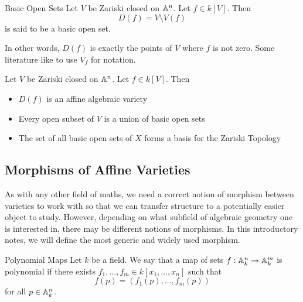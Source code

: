 \documentclass[a4paper]{article}
\begin{document}
\begin{defn}{Basic Open Sets}{} Let $V$ be Zariski closed on $\mathbb{A}^n$. Let $f\in k[V]$. Then $$D(f)=V\setminus V(f)$$ is said to be a basic open set. 
\end{defn}

In other words, $D(f)$ is exactly the points of $V$ where $f$ is not zero. Some literature like to use $V_f$ for notation. 

\begin{prp}{}{} Let $V$ be Zariski closed on $\mathbb{A}^n$. Let $f\in k[V]$. Then 
\begin{itemize}
\item $D(f)$ is an affine algebraic variety
\item Every open subset of $V$ is a union of basic open sets
\item The set of all basic open sets of $X$ forms a basis for the Zariski Topology
\end{itemize}
\end{prp}

\subsection{Morphisms of Affine Varieties}
As with any other field of maths, we need a correct notion of morphism between varieties to work with so that we can transfer structure to a potentially easier object to study. However, depending on what subfield of algebraic geometry one is interested in, there may be different notions of morphisms. In this introductory notes, we will define the most generic and widely used morphism. 

\begin{defn}{Polynomial Maps}{} Let $k$ be a field. We say that a map of sets $f:\mathbb{A}_k^n\to\mathbb{A}_k^m$ is polynomial if there exists $f_1,\dots,f_m\in k[x_1,\dots,x_n]$ such that $$f(p)=(f_1(p),\dots,f_m(p))$$ for all $p\in\mathbb{A}_k^n$. 
\end{defn}
\end{document}
